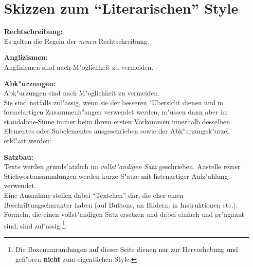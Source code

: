 \section{Skizzen zum ``Literarischen'' Style}\label{lit_style}

\begin{list_sabina}

\item
\textbf{Rechtschreibung:}\\
Es gelten die Regeln der \textit{neuen} Rechtschreibung.

\item
\textbf{Anglizismen:}\\
Anglizismen sind nach M"oglichkeit zu vermeiden.

\item
\textbf{Abk"urzungen:}\\
Abk"urzungen sind nach M"oglichkeit zu vermeiden.\\
Sie sind notfalls zul"assig, wenn sie der besseren "Ubersicht dienen
und in formelartigen Zusammenh"angen verwendet werden,
m"ussen dann aber im standalone-Sinne immer beim ihrem ersten
Vorkommen innerhalb desselben Elementes oder Subelementes 
ausgeschrieben sowie der Abk"urzungsk"urzel erkl"art werden:

\begin{center}
\end{center}

\item
\textbf{Satzbau:}\\
Texte werden grunds"atzlich im \emph{vollst"andigen Satz} geschrieben.
Anstelle reiner Stichwortansammlungen werden kurze S"atze mit
listenartiger Aufz"ahlung verwendet.\\
Eine Ausnahme stellen dabei ``Textchen'' dar, die eher einen 
Beschriftungscharakter haben (auf Buttons, an Bildern, 
in Instruktionen etc.).\\
Formeln, die einen vollst"andigen Satz ersetzen und dabei
einfach und pr"agnant sind, sind zul"assig
\footnote{Die Boxenumrandungen auf dieser Seite dienen nur zur Hervorhebung und geh"oren
\textbf{nicht} zum eigentlichen Style.}:

\begin{center}
\end{center}



\end{list_sabina}
